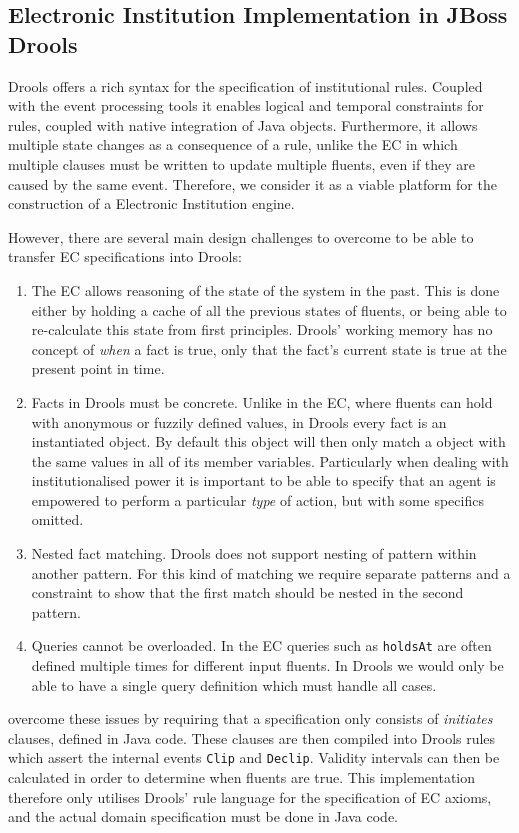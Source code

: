 \subsection{Electronic Institution Implementation in JBoss Drools}

Drools offers a rich syntax for the specification of institutional rules.
Coupled with the event processing tools it enables logical and temporal
constraints for rules, coupled with native integration of Java objects.
Furthermore, it allows multiple state changes as a consequence of a rule, unlike
the \ac{EC} in which multiple clauses must be written to update multiple
fluents, even if they are caused by the same event. Therefore, we consider it as
a viable platform for the construction of a Electronic Institution engine.

However, there are several main design challenges to overcome to be able to transfer
\ac{EC} specifications into Drools:
\begin{enumerate}
\item The \ac{EC} allows reasoning of the state of the system in the past. This is
done either by holding a cache of all the previous states of fluents, or being
able to re-calculate this state from first principles. Drools' working memory
has no concept of \emph{when} a fact is true, only that the fact's current
state is true at the present point in time.
\item Facts in Drools must be concrete. Unlike in the \ac{EC}, where fluents can
hold with anonymous or fuzzily defined values, in Drools every fact is an
instantiated object. By default this object will then only match a object with
the same values in all of its member variables. Particularly when dealing with
institutionalised power it is important to be able to specify that an agent is
empowered to perform a particular \emph{type} of action, but with some specifics
omitted.
\item Nested fact matching. Drools does not support nesting of pattern within
another pattern. For this kind of matching we require separate patterns and a
constraint to show that the first match should be nested in the second pattern.
\item Queries cannot be overloaded. In the \ac{EC} queries such as \texttt{holdsAt}
are often defined multiple times for different input fluents. In Drools we would
only be able to have a single query definition which must handle all cases.
\end{enumerate}

\citet{Bragaglia2012} overcome these issues by requiring that a specification
only consists of \emph{initiates} clauses, defined in Java code. These clauses
are then compiled into Drools rules which assert the internal events
\texttt{Clip} and \texttt{Declip}. Validity intervals can then be calculated
in order to determine when fluents are true. This implementation therefore only
utilises Drools' rule language for the specification of \ac{EC} axioms, and the
actual domain specification must be done in Java code.

